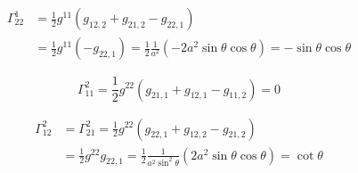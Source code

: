 \documentclass[12pt]{article}
\begin{document}
\begin{equation}
\begin{aligned}
\displaystyle 
\Gamma^{1}_{22} &= \frac{1}{2}g^{11}(g_{12,2}+g_{21,2}-g_{22,1})\\
&=\frac{1}{2}g^{11}(-g_{22,1})=\frac{1}{2}\frac{1}{a^{2}}(-2a^{2}\sin\theta\cos\theta)=-\sin\theta\cos\theta
\end{aligned}
	\tag{7.2}
\end{equation}

\begin{equation}
\displaystyle 
\Gamma^{2}_{11} = \frac{1}{2}g^{22}(g_{21,1}+g_{12,1}-g_{11,2})=0 
	\tag{7.3}
\end{equation}

\begin{equation}
\begin{aligned}
\displaystyle 
\Gamma^{2}_{12} &= \Gamma^{2}_{21} = \frac{1}{2}g^{22}(g_{22,1}+g_{12,2}-g_{21,2})\\
&=\frac{1}{2}g^{22}g_{22,1}=\frac{1}{2}\frac{1}{a^{2}\sin^{2}\theta}(2a^{2}\sin\theta\cos\theta)=\cot\theta
\end{aligned}
	\tag{7.4}
\end{equation}
\end{document}
